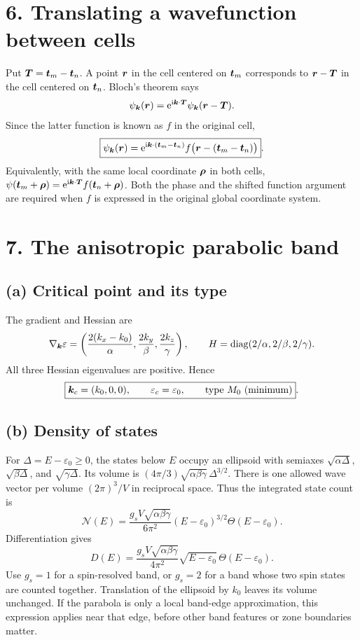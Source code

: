 \section*{6. Translating a wavefunction between cells}
Put $\boldsymbol{T}=\boldsymbol{t}_m-\boldsymbol{t}_n$. A point $\boldsymbol{r}$ in the cell centered on $\boldsymbol{t}_m$ corresponds to $\boldsymbol{r}-\boldsymbol{T}$ in the cell centered on $\boldsymbol{t}_n$. Bloch's theorem says
\[
\psi_{\boldsymbol{k}}(\boldsymbol{r})=\mathrm{e}^{\mathrm{i}\boldsymbol{k}\cdot\boldsymbol{T}}
\psi_{\boldsymbol{k}}(\boldsymbol{r}-\boldsymbol{T}).
\]
Since the latter function is known as $f$ in the original cell,
\[
\boxed{\psi_{\boldsymbol{k}}(\boldsymbol{r})
=\mathrm{e}^{\mathrm{i}\boldsymbol{k}\cdot(\boldsymbol{t}_m-\boldsymbol{t}_n)}
f\bigl(\boldsymbol{r}-(\boldsymbol{t}_m-\boldsymbol{t}_n)\bigr)}.
\]
Equivalently, with the same local coordinate $\boldsymbol{\rho}$ in both cells,
$\psi(\boldsymbol{t}_m+\boldsymbol{\rho})=\mathrm{e}^{\mathrm{i}\boldsymbol{k}\cdot\boldsymbol{T}}f(\boldsymbol{t}_n+\boldsymbol{\rho})$.
Both the phase and the shifted function argument are required when $f$ is expressed in the original global coordinate system.

\section*{7. The anisotropic parabolic band}
\subsection*{(a) Critical point and its type}
The gradient and Hessian are
\[
\nabla_{\boldsymbol{k}}\varepsilon=
\left(\frac{2(k_x-k_0)}\alpha,\frac{2k_y}\beta,\frac{2k_z}\gamma\right),
\qquad H=\operatorname{diag}(2/\alpha,2/\beta,2/\gamma).
\]
All three Hessian eigenvalues are positive. Hence
\[
\boxed{\boldsymbol{k}_c=(k_0,0,0),\qquad \varepsilon_c=\varepsilon_0,
\qquad \text{type }M_0\ \text{(minimum)}}.
\]

\subsection*{(b) Density of states}
For $\Delta=E-\varepsilon_0\ge0$, the states below $E$ occupy an ellipsoid with semiaxes
$\sqrt{\alpha\Delta}$, $\sqrt{\beta\Delta}$, and $\sqrt{\gamma\Delta}$. Its volume is
$(4\pi/3)\sqrt{\alpha\beta\gamma}\,\Delta^{3/2}$. There is one allowed wave vector per volume $(2\pi)^3/V$ in reciprocal space. Thus the integrated state count is
\[
\mathcal N(E)=\frac{g_sV\sqrt{\alpha\beta\gamma}}{6\pi^2}
(E-\varepsilon_0)^{3/2}\Theta(E-\varepsilon_0).
\]
Differentiation gives
\[
\boxed{D(E)=\frac{g_sV\sqrt{\alpha\beta\gamma}}{4\pi^2}
\sqrt{E-\varepsilon_0}\,\Theta(E-\varepsilon_0)}.
\]
Use $g_s=1$ for a spin-resolved band, or $g_s=2$ for a band whose two spin states are counted together. Translation of the ellipsoid by $k_0$ leaves its volume unchanged. If the parabola is only a local band-edge approximation, this expression applies near that edge, before other band features or zone boundaries matter.

